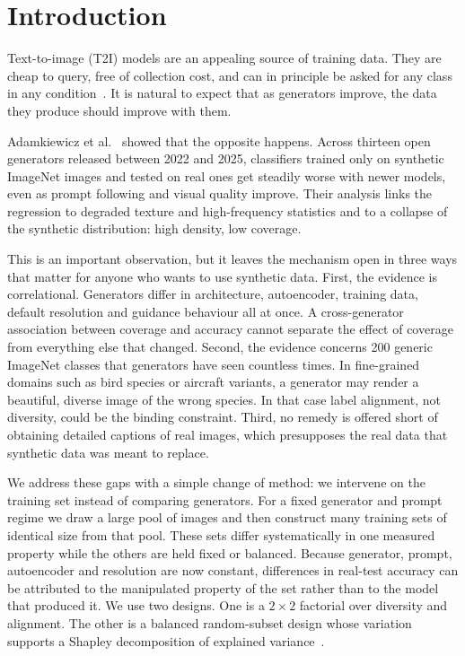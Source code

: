 \documentclass[10pt,twocolumn,letterpaper]{article}
\begin{document}
\section{Introduction}
Text-to-image (T2I) models are an appealing source of training data. They are cheap to query, free of collection cost, and can in principle be asked for any class in any condition~\cite{sariyildiz2023fake,he2023synthetic,azizi2023synthetic,rombach2022high}. It is natural to expect that as generators improve, the data they produce should improve with them.

Adamkiewicz et al.~\cite{adamkiewicz2026pretty} showed that the opposite happens. Across thirteen open generators released between 2022 and 2025, classifiers trained only on synthetic ImageNet images and tested on real ones get steadily worse with newer models, even as prompt following and visual quality improve. Their analysis links the regression to degraded texture and high-frequency statistics and to a collapse of the synthetic distribution: high density, low coverage.

This is an important observation, but it leaves the mechanism open in three ways that matter for anyone who wants to use synthetic data. First, the evidence is correlational. Generators differ in architecture, autoencoder, training data, default resolution and guidance behaviour all at once. A cross-generator association between coverage and accuracy cannot separate the effect of coverage from everything else that changed. Second, the evidence concerns 200 generic ImageNet classes that generators have seen countless times. In fine-grained domains such as bird species or aircraft variants, a generator may render a beautiful, diverse image of the wrong species. In that case label alignment, not diversity, could be the binding constraint. Third, no remedy is offered short of obtaining detailed captions of real images, which presupposes the real data that synthetic data was meant to replace.

We address these gaps with a simple change of method: we intervene on the training set instead of comparing generators. For a fixed generator and prompt regime we draw a large pool of images and then construct many training sets of identical size from that pool. These sets differ systematically in one measured property while the others are held fixed or balanced. Because generator, prompt, autoencoder and resolution are now constant, differences in real-test accuracy can be attributed to the manipulated property of the set rather than to the model that produced it. We use two designs. One is a $2{\times}2$ factorial over diversity and alignment. The other is a balanced random-subset design whose variation supports a Shapley decomposition of explained variance~\cite{gromping2006relative,lipovetsky2001analysis}.
\end{document}
